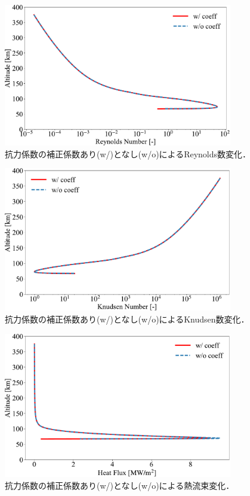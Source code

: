 \begin{figure}[H]
    \centering
    \includegraphics[width=10cm]{fig/couple/cd-coeff/re.pdf}
    \caption{抗力係数の補正係数あり(w/)となし(w/o)によるReynolds数変化．}
    \label{fig:couble-cd-re}
\end{figure}
\begin{figure}[H]
    \centering
    \includegraphics[width=10cm]{fig/couple/cd-coeff/kn.pdf}
    \caption{抗力係数の補正係数あり(w/)となし(w/o)によるKnudsen数変化．}
    \label{fig:couble-cd-kn}
\end{figure}
\begin{figure}[H]
    \centering
    \includegraphics[width=10cm]{fig/couple/cd-coeff/heat.pdf}
    \caption{抗力係数の補正係数あり(w/)となし(w/o)による熱流束変化．}
    \label{fig:couble-cd-heat}
\end{figure}


